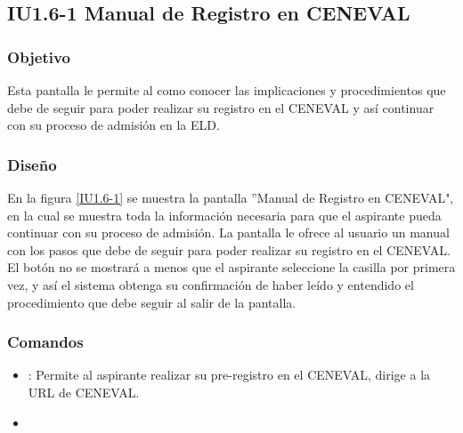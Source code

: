 \subsection{IU1.6-1 Manual de Registro en CENEVAL}

\subsubsection{Objetivo}

Esta pantalla le permite al  como conocer las implicaciones y procedimientos que debe de seguir para poder realizar su registro en el CENEVAL y así continuar con su proceso de admisión en la ELD.


\subsubsection{Diseño}
En la figura \ref{IU1.6-1} se muestra la pantalla ''Manual de Registro en CENEVAL", en la cual se muestra toda la información necesaria para que el aspirante pueda continuar con su proceso de admisión. La pantalla le ofrece al usuario un manual con los pasos que debe de seguir para poder realizar su registro en el CENEVAL.
El botón  no se mostrará a menos que el aspirante seleccione la casilla \btnTerminos por primera vez, y así el sistema obtenga su confirmación de haber leído y entendido el procedimiento que debe seguir al salir de la pantalla. 



\subsubsection{Comandos}
\begin{itemize}
	\item {}: Permite al aspirante realizar su pre-registro en el CENEVAL, dirige a la URL de CENEVAL.
	\item 
\end{itemize}

